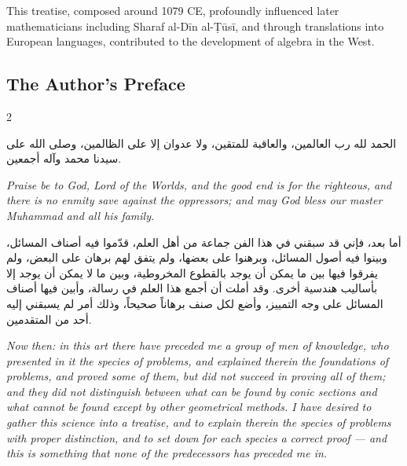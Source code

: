 \documentclass[11pt,a4paper]{book}
\begin{document}
This treatise, composed around 1079 CE, profoundly influenced later mathematicians including Sharaf al-Dīn al-Ṭūsī, and through translations into European languages, contributed to the development of algebra in the West.

\subsection{The Author's Preface}
\label{subsec:preface}

\begin{propositionbox}

\begin{paracol}{2}

\begin{Arabic}
الحمد لله رب العالمين، والعاقبة للمتقين، ولا عدوان إلا على الظالمين، وصلى الله على سيدنا محمد وآله أجمعين.
\end{Arabic}

\switchcolumn

\textit{Praise be to God, Lord of the Worlds, and the good end is for the righteous, and there is no enmity save against the oppressors; and may God bless our master Muhammad and all his family.}

\switchcolumn*

\begin{Arabic}
أما بعد، فإني قد سبقني في هذا الفن جماعة من أهل العلم، قدّموا فيه أصناف المسائل، وبينوا فيه أصول المسائل، وبرهنوا على بعضها، ولم يتفق لهم برهان على البعض، ولم يفرقوا فيها بين ما يمكن أن يوجد بالقطوع المخروطية، وبين ما لا يمكن أن يوجد إلا بأساليب هندسية أخرى. وقد أملت أن أجمع هذا العلم في رسالة، وأبين فيها أصناف المسائل على وجه التمييز، وأضع لكل صنف برهاناً صحيحاً، وذلك أمر لم يسبقني إليه أحد من المتقدمين.
\end{Arabic}

\switchcolumn

\textit{Now then: in this art there have preceded me a group of men of knowledge, who presented in it the species of problems, and explained therein the foundations of problems, and proved some of them, but did not succeed in proving all of them; and they did not distinguish between what can be found by conic sections and what cannot be found except by other geometrical methods. I have desired to gather this science into a treatise, and to explain therein the species of problems with proper distinction, and to set down for each species a correct proof --- and this is something that none of the predecessors has preceded me in.}

\end{paracol}
\end{propositionbox}
\end{document}
